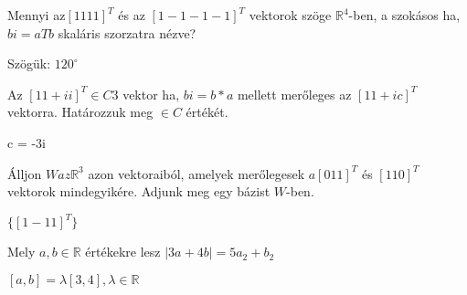 \begin{frame}
  \begin{tcolorbox}[title={10/1. {\symknight}}]
    Mennyi az$[1 1 1 1]^T$ és az $[1 -1 -1 -1]^T$ vektorok szöge $\mathbb{R}^4$-ben, a szokásos ha, $bi = aTb$ skaláris szorzatra nézve?

  \tcblower

    \mmedskip 
    
    Szögük: $120^{\circ}$

  \end{tcolorbox}
\end{frame}


\begin{frame}
  \begin{tcolorbox}[title={10/2. {\symrook}}]
    Az $[1 1 + i i]^T \in C3$ vektor ha, $bi = b*a$ mellett merőleges az $[1 1 + i c]^T$ vektorra. Határozzuk meg $ \in C$ értékét.


  \tcblower

    \mmedskip 
    
    c = -3i
  \end{tcolorbox}
\end{frame}


\begin{frame}
  \begin{tcolorbox}[title={10/3. {\symrook}}]
    Álljon $W az \mathbb{R}^3$ azon vektoraiból, amelyek merőlegesek $a[0 1 1]^T$ és $[1 1 0]^T$ vektorok mindegyikére. Adjunk meg egy bázist $W$-ben.

  \tcblower

    \mmedskip 
    
    $\{[1 -1 1]^T\}$
  \end{tcolorbox}
\end{frame}


\begin{frame}
  \begin{tcolorbox}[title={10/4. {\symqueen}}]
    Mely $a,b \in \mathbb{R}$ értékekre lesz $|3a + 4b| = 5a_2 + b_2$

  \tcblower

    \mmedskip 
    
    $[a,b] = {\lambda}[3,4], {\lambda} \in \mathbb{R}$
  \end{tcolorbox}
\end{frame}


